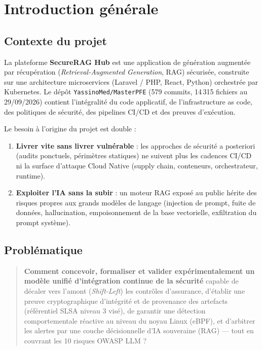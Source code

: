 \documentclass[12pt,a4paper,openany]{report}
\begin{document}
\tableofcontents
\listoftables
\listoffigures

\chapter{Introduction générale}
\label{ch:intro}

\section{Contexte du projet}

La plateforme \textbf{SecureRAG Hub} est une application de génération augmentée par récupération
(\textit{Retrieval-Augmented Generation}, RAG) sécurisée, construite sur une architecture microservices
(Laravel / PHP, React, Python) orchestrée par Kubernetes.
Le dépôt \texttt{YassinoMed/MasterPFE} (579 commits, 14\,315 fichiers au 29/09/2026) contient
l'intégralité du code applicatif, de l'infrastructure as code, des politiques de sécurité,
des pipelines CI/CD et des preuves d'exécution.

Le besoin à l'origine du projet est double :
\begin{enumerate}
  \item \textbf{Livrer vite sans livrer vulnérable} : les approches de sécurité a posteriori
  (audits ponctuels, périmètres statiques) ne suivent plus les cadences CI/CD ni la surface
  d'attaque Cloud Native (supply chain, conteneurs, orchestrateur, runtime).
  \item \textbf{Exploiter l'IA sans la subir} : un moteur RAG exposé au public hérite des risques
  propres aux grands modèles de langage (injection de prompt, fuite de données, hallucination,
  empoisonnement de la base vectorielle, exfiltration du prompt système).
\end{enumerate}

\section{Problématique}

\begin{quote}
\textbf{Comment concevoir, formaliser et valider expérimentalement un modèle unifié
d'intégration continue de la sécurité} capable de décaler vers l'amont (\textit{Shift-Left})
les contrôles d'assurance, d'établir une preuve cryptographique d'intégrité et de provenance
des artefacts (référentiel SLSA niveau 3 visé), de garantir une détection comportementale
réactive au niveau du noyau Linux (eBPF), et d'arbitrer les alertes par une couche
décisionnelle d'IA souveraine (RAG) — tout en couvrant les 10 risques OWASP LLM ?
\end{quote}
\end{document}
